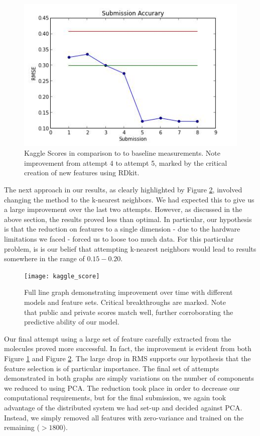 \documentclass[letterpaper]{article}
\begin{document}
\begin{center}
\begin{figure}[h!]
\includegraphics[scale=0.6]{accuracy_results}
\caption{Kaggle Scores in comparison to to baseline measurements. Note improvement from attempt 4 to attempt 5, marked by the critical creation of new features using RDkit.}
\label{fig:kaggle_score_two}
\end{figure}
\end{center}

\noindent The next approach in our results, as clearly highlighted by Figure \ref{fig:kaggle_score}, involved changing the method to the k-nearest neighbors. We had expected this to give us a large improvement over the last two attempts. However, as discussed in the above section, the results proved less than optimal. In particular, our hypothesis is that the reduction on features to a single dimension - due to the hardware limitations we faced - forced us to loose too much data. For this particular problem, is is our belief that attempting k-nearest neighbors would lead to results somewhere in the range of $0.15-0.20$. 
\begin{center}
\begin{figure}[h!]
\texttt{[image: kaggle\_score]}
\caption{Full line graph demonstrating improvement over time with different models and feature sets. Critical breakthroughs are marked. Note that public and private scores match well, further corroborating the predictive ability of our model.}
\label{fig:kaggle_score}
\end{figure}  
\end{center}
\noindent Our final attempt using a large set of feature carefully extracted from the molecules proved more successful. In fact, the improvement is evident from both Figure \ref{fig:kaggle_score_two} and Figure \ref{fig:kaggle_score}. The large drop in RMS supports our hypothesis that the feature selection is of particular importance. The final set of attempts demonstrated in both graphs are simply variations on the number of components we reduced to using PCA. The reduction took place in order to decrease our computational requirements, but for the final submission, we again took advantage of the distributed system we had set-up and decided against PCA. Instead, we simply removed all features with zero-variance and trained on the remaining ($> 1800$). 
\end{document}
